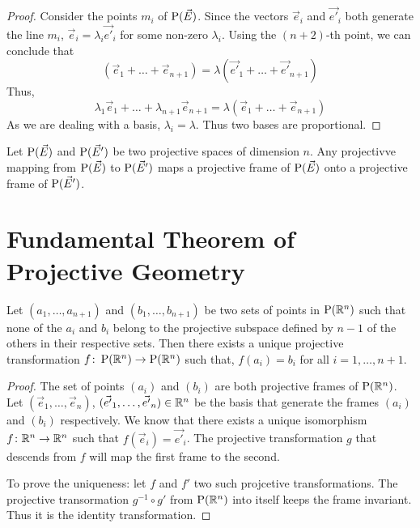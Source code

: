 \begin{proof}
  Consider the points $m_i$ of $\operatorname{P}(\vec{E})$. Since the vectors $\vec{e}_i$ and $\vec{e'}_i$ both generate the line
  $m_i$, $\vec{e}_i=\lambda_i \vec{e'}_i$ for some non-zero $\lambda_i$. Using the $(n+2)$-th point, we can
  conclude that 
  \[
    (\vec{e}_1+\dots+\vec{e}_{n+1})=\lambda(\vec{e'}_1+\dots+\vec{e'}_{n+1})
  \]
  Thus,
  \[
      \lambda_1\vec{e}_1+\dots+\lambda_{n+1}\vec{e}_{n+1}=\lambda(\vec{e}_1+\dots+\vec{e}_{n+1})
  \]
  As we are dealing with a basis, $\lambda_i=\lambda$. Thus two bases are proportional.
\end{proof}

\begin{prop}
  Let $\operatorname{P}(\vec{E})$ and $\operatorname{P}(\vec{E}')$ be two projective spaces of dimension $n$. Any projectivve mapping from
  $\operatorname{P}(\vec{E})$ to $\operatorname{P}(\vec{E}')$ maps a projective frame of $\operatorname{P}(\vec{E})$ onto a projective frame of $\operatorname{P}(\vec{E}')$.
\end{prop}

\section{Fundamental Theorem of Projective Geometry}

\begin{theorem} \label{thm:fundprojgeo}
    Let $(a_1,\dots,a_{n+1})$ and $(b_1,\dots,b_{n+1})$ be two sets of points in $\operatorname{P}(\mathbb{R}^n)$ such
  that none of the $a_i$ and $b_i$ belong to the projective subspace defined by $n-1$ of the others
  in their respective sets. Then there exists a unique projective transformation
  $f\colon\operatorname{P}(\mathbb{R}^n)\to\operatorname{P}(\mathbb{R}^n)$ such that, $f(a_i)=b_i$ for all $i=1,\dots,n+1$.
\end{theorem}

\begin{proof}
  The set of points $(a_i)$ and $(b_i)$ are both projective frames of $\operatorname{P}(\mathbb{R}^n)$. Let
  $(\vec{e}_1,\dots,\vec{e}_n)$, $(\vec{e'}_1,\ldots,\vec{e'}_n)\in\mathbb{R}^n$ be the basis that generate the frames
  $(a_i)$ and $(b_i)$ respectively. We know that there exists a unique isomorphism
  $f\colon\mathbb{R}^n\to\mathbb{R}^n$ such that $f(\vec{e}_i)=\vec{e'}_i$. The projective transformation $g$
  that descends from $f$ will map the first frame to the second.

  To prove the uniqueness: let $f$ and $f'$ two such projcetive transformations. The projective
  transormation $g^{-1}\circ g'$ from $\operatorname{P}(\mathbb{R}^n)$ into itself keeps the frame invariant. Thus
  it is the identity transformation.
\end{proof}


